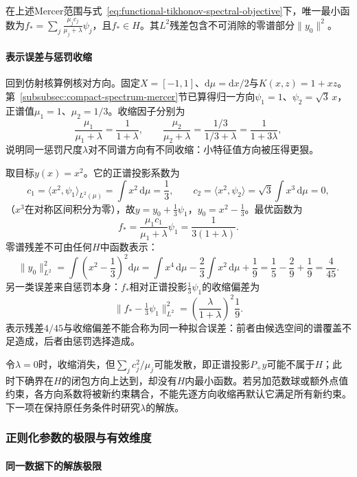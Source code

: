\begin{theorem}[谱基下的正则化解]\label{thm:functional-spectral-shrinkage}
在上述Mercer范围与式~\eqref{eq:functional-tikhonov-spectral-objective}下，唯一最小函数为$f_*=\sum_j\frac{\mu_jc_j}{\mu_j+\lambda}\psi_j$，且$f_*\in H$。其$L^2$残差包含不可消除的零谱部分$\|y_0\|^2$。
\end{theorem}

\paragraph{表示误差与惩罚收缩}

回到仿射核算例核对方向。固定$X=[-1,1]$、$\mathrm d\mu=\mathrm dx/2$与$K(x,z)=1+xz$。第~\ref{subsubsec:compact-spectrum-mercer}节已算得归一方向$\psi_1=1$、$\psi_2=\sqrt3\,x$，正谱值$\mu_1=1$、$\mu_2=1/3$。收缩因子分别为
\[
  \frac{\mu_1}{\mu_1+\lambda}=\frac1{1+\lambda},
  \qquad
  \frac{\mu_2}{\mu_2+\lambda}=\frac{1/3}{1/3+\lambda}=\frac1{1+3\lambda},
\]
说明同一惩罚尺度$\lambda$对不同谱方向有不同收缩：小特征值方向被压得更狠。

取目标$y(x)=x^2$。它的正谱投影系数为
\[
  c_1=\langle x^2,\psi_1\rangle_{L^2(\mu)}=\int x^2\,\mathrm d\mu=\frac13,
  \qquad
  c_2=\langle x^2,\psi_2\rangle=\sqrt3\int x^3\,\mathrm d\mu=0,
\]
（$x^3$在对称区间积分为零），故$y=y_0+\frac13\psi_1$，$y_0=x^2-\frac13$。最优函数为
\[
  f_*=\frac{\mu_1c_1}{\mu_1+\lambda}\psi_1=\frac{1}{3(1+\lambda)}.
\]
零谱残差不可由任何$H$中函数表示：
\[
  \|y_0\|_{L^2}^2
  =\int\left(x^2-\frac13\right)^2\mathrm d\mu
  =\int x^4\,\mathrm d\mu-\frac23\int x^2\,\mathrm d\mu+\frac19
  =\frac15-\frac29+\frac19=\frac4{45}.
\]
另一类误差来自惩罚本身：$f_*$相对正谱投影$\frac13\psi_1$的收缩偏差为
\[
  \|f_*-\tfrac13\psi_1\|_{L^2}^2
  =\left(\frac{\lambda}{1+\lambda}\right)^2\frac19.
\]
表示残差$4/45$与收缩偏差不能合称为同一种拟合误差：前者由候选空间的谱覆盖不足造成，后者由惩罚选择造成。

令$\lambda=0$时，收缩消失，但$\sum_jc_j^2/\mu_j$可能发散，即正谱投影$P_+y$可能不属于$H$；此时下确界在$H$的闭包方向上达到，却没有$H$内最小函数。若另加范数球或额外点值约束，各方向系数将被新约束耦合，不能先逐方向收缩再默认它满足所有新约束。下一项在保持原任务条件时研究$\lambda$的解族。

\subsubsection{正则化参数的极限与有效维度}
\label{subsubsec:regularization-effective-dimension}

\paragraph{同一数据下的解族极限}

